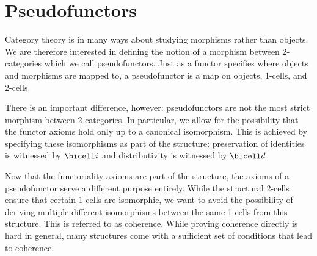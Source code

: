 \section{Pseudofunctors}\label{sec:inclusions}

Category theory is in many ways about studying morphisms rather than objects.
We are therefore interested in defining the notion of a morphism between 2-categories which we
call pseudofunctors.
Just as a functor specifies where objects and morphisms are mapped to,
a pseudofunctor is a map on objects, 1-cells, and 2-cells.

There is an important difference, however: pseudofunctors are not the
most strict morphism between 2-categories. In particular, we allow for
the possibility that the functor axioms hold only up to a canonical
isomorphism. This is achieved by specifying these isomorphisms as part
of the structure: preservation of identities is witnessed by $\bicell i$
and distributivity is witnessed by $\bicell d$.

Now that the functoriality axioms are part of the structure, the axioms of a
pseudofunctor serve a different purpose entirely. While the structural 2-cells
ensure that certain 1-cells are isomorphic, we want to avoid the possibility of
deriving multiple different isomorphisms between the same 1-cells from this
structure. This is referred to as coherence. While proving coherence directly
is hard in general, many structures come with a sufficient set of conditions
that lead to coherence.

